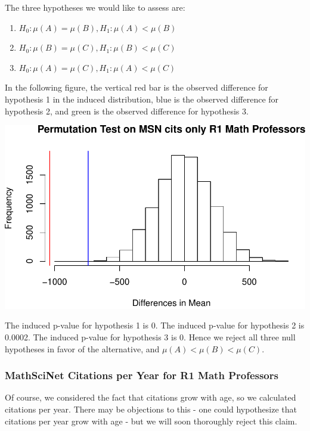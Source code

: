 \documentclass[]{article}
\begin{document}
The three hypotheses we would like to assess are:

\begin{enumerate}
\def\labelenumi{\arabic{enumi}.}
\item
  \(H_0: \mu(A) = \mu(B), H_1: \mu(A) < \mu(B)\)
\item
  \(H_0: \mu(B) = \mu(C), H_1: \mu(B) < \mu(C)\)
\item
  \(H_0: \mu(A) = \mu(C), H_1: \mu(A) < \mu(C)\)
\end{enumerate}

In the following figure, the vertical red bar is the observed difference
for hypothesis 1 in the induced distribution, blue is the observed
difference for hypothesis 2, and green is the observed difference for
hypothesis 3.

\includegraphics{Response_files/figure-latex/unnamed-chunk-12-1.pdf}

The induced p-value for hypothesis 1 is 0. The induced p-value for
hypothesis 2 is 0.0002. The induced p-value for hypothesis 3 is 0. Hence
we reject all three null hypotheses in favor of the alternative, and
\(\mu(A) < \mu(B) < \mu(C)\).

\hypertarget{mathscinet-citations-per-year-for-r1-math-professors}{%
\subsubsection{MathSciNet Citations per Year for R1 Math
Professors}\label{mathscinet-citations-per-year-for-r1-math-professors}}

Of course, we considered the fact that citations grow with age, so we
calculated citations per year. There may be objections to this - one
could hypothesize that citations per year grow with age - but we will
soon thoroughly reject this claim.
\end{document}
